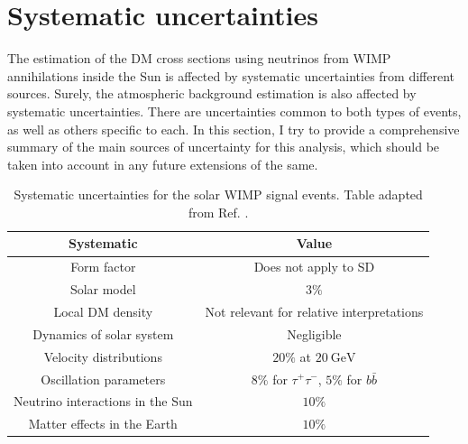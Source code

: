 \section{Systematic uncertainties}
\label{sec:dm_analysis_systematics}

The estimation of the DM cross sections using neutrinos from WIMP annihilations inside the Sun is affected by systematic uncertainties from different sources. Surely, the atmospheric background estimation is also affected by systematic uncertainties. There are uncertainties common to both types of events, as well as others specific to each. In this section, I try to provide a comprehensive summary of the main sources of uncertainty for this analysis, which should be taken into account in any future extensions of the same.

\begin{table}[t]
	\caption[Systematic uncertainties for the solar WIMP signal events.]{Systematic uncertainties for the solar WIMP signal events. Table adapted from Ref. \cite{Principato2021}.}
	\begin{center}
		\begin{small}
			\begin{tabular}{c|c}
				Systematic                         & Value \\[2mm] \hline
				\rule{0pt}{1.1\normalbaselineskip}Form factor                      & Does not apply to SD \cite{Wikstroem2009} \\[2mm]
				Solar model                      & $3\%$ \cite{Wikstroem2009} \\[2mm]
				Local DM density                 & Not relevant for relative interpretations \cite{Wikstroem2009,Super-Kamiokande2015} \\[2mm]
				Dynamics of solar system         & Negligible \cite{Rott2011} \\[2mm]
				Velocity distributions           & $20\%$ at $20~\mathrm{GeV}$ \cite{Wikstroem2009,Super-Kamiokande2015} \\[2mm] \hline
				\rule{0pt}{1.1\normalbaselineskip}Oscillation parameters           & $8\%$ for $\tau^{+}\tau^{-}$, $5\%$ for $b\bar{b}$ \cite{Boliev2013} \\[2mm]
				Neutrino interactions in the Sun & $10\%$ \\[2mm]
				Matter effects in the Earth      & $10\%$ 
			\end{tabular}
		\end{small}
	\end{center}
	\label{tab:solar_dm_signal_uncertainties}
\end{table}

